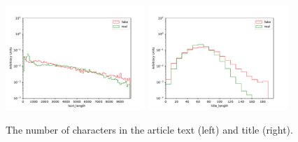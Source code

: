 \documentclass[a4paper,12pt]{article} %
\begin{document}
\begin{figure}[h!]
\caption{The number of characters in the article text (left) and title (right). \label{fig:text_title_length}}
\begin{center}
\includegraphics[width=0.47\textwidth]{plots/text_length} \hspace{0.2cm}
\includegraphics[width=0.47\textwidth]{plots/title_length}
\end{center}
\end{figure}
\end{document}
